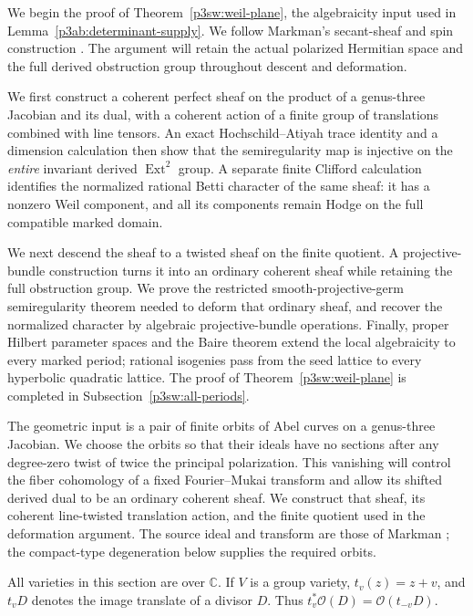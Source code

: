 \documentclass[11pt]{article}
\newcommand{\C}{\mathbb C}
\numberwithin{equation}{section}
\begin{document}
We begin the proof of Theorem~\ref{p3sw:weil-plane}, the algebraicity
input used in Lemma~\ref{p3ab:determinant-supply}.  We follow Markman's
secant-sheaf and spin construction
\cite{Markman2025Secant,Markman2026ICM}.
The argument will retain the actual polarized Hermitian space and the
full derived obstruction group throughout descent and deformation.

We first construct a coherent perfect sheaf on the product of a
genus-three Jacobian and its dual, with a coherent action of a finite
group of translations combined with line tensors.  An exact
Hochschild--Atiyah trace identity and a dimension calculation then show
that the semiregularity map is injective on the \emph{entire} invariant
derived \(\operatorname{Ext}^2\) group.  A separate finite Clifford
calculation identifies the normalized rational Betti character of the
same sheaf: it has a nonzero Weil component, and all its components
remain Hodge on the full compatible marked domain.

We next descend the sheaf to a twisted sheaf on the finite quotient.
A projective-bundle construction turns it into an ordinary coherent
sheaf while retaining the full obstruction group.  We prove the
restricted smooth-projective-germ semiregularity theorem needed to
deform that ordinary sheaf, and recover the normalized character by
algebraic projective-bundle operations.  Finally, proper Hilbert
parameter spaces and the Baire theorem extend the local algebraicity
to every marked period; rational isogenies pass from the seed lattice
to every hyperbolic quadratic lattice.  The proof of
Theorem~\ref{p3sw:weil-plane} is completed in
Subsection~\ref{p3sw:all-periods}.

The geometric input is a pair of finite orbits of Abel curves on a
genus-three Jacobian.  We choose the orbits so that their ideals have no
sections after any degree-zero twist of twice the principal polarization.
This vanishing will control the fiber cohomology of a fixed
Fourier--Mukai transform and allow its shifted derived dual to be an
ordinary coherent sheaf.  We construct that sheaf, its coherent
line-twisted translation action, and the finite quotient used in the
deformation argument.  The source ideal and transform are those of
Markman \cite[(6.2.1), (6.2.3), and (9.2.1)]{Markman2025Secant};
the compact-type degeneration below supplies the required orbits.

All varieties in this section are over \(\C\).  If \(V\) is a group
variety, \(t_v(z)=z+v\), and \(t_vD\) denotes the image translate of a
divisor \(D\).  Thus \(t_v^*\mathcal O(D)=\mathcal O(t_{-v}D)\).
\end{document}
